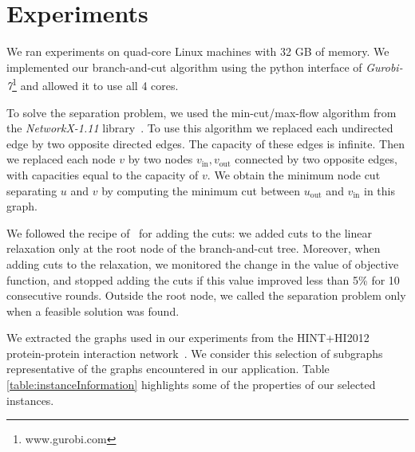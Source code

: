 \documentclass[conference]{IEEEtran}
\begin{document}
\section{Experiments}
\label{sec:experiments}
%
%
%
%
We ran experiments on quad-core Linux machines with 32 GB of memory. We implemented our branch-and-cut algorithm using the python interface
of \emph{Gurobi-7}\footnote{www.gurobi.com} and allowed it to use all 4 cores.

To solve the separation problem, we used the min-cut/max-flow algorithm from the \emph{NetworkX-1.11} library~\cite{NetworkX}. To use this algorithm we replaced
each undirected edge by two opposite directed edges. The capacity of
these edges is infinite. Then we replaced each node $v$ by two
nodes $v_{\text{in}}, v_{\text{out}}$ connected by two opposite
edges, with capacities equal to the capacity of $v$. We obtain the
minimum node cut separating $u$ and $v$ by computing the minimum cut
between $u_{\text{out}}$ and $v_{\text{in}}$ in this graph.

We followed the recipe of~\cite{CarvajalCGVW13} for adding the cuts: we added cuts to the
linear relaxation only at the root node of the branch-and-cut tree.
Moreover, when adding cuts to the relaxation, we monitored the change in
the value of objective function, and stopped adding the cuts if this
value improved less than 5\% for 10 consecutive rounds. Outside the root
node, we called the separation problem only when a feasible solution was
found.

We extracted the graphs used in our experiments from the HINT+HI2012 protein-protein interaction network~\cite{das2012hint,yu2011next}. We consider this selection of subgraphs representative of the graphs encountered in our application.
%
Table \ref{table:instanceInformation} highlights some of the properties of our selected instances.
\end{document}
